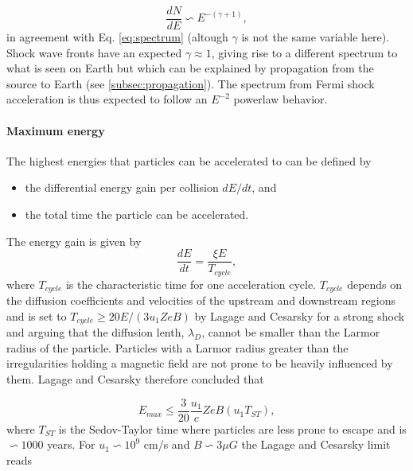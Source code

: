 \begin{equation}
\frac{dN}{dE} \backsim E^{-(\gamma + 1)},
\end{equation}
in agreement with Eq. \ref{eq:spectrum} (altough $\gamma$ is not the same variable here). Shock wave fronts have an expected $\gamma \approx 1$, giving rise to a different spectrum to what is seen on Earth but which can be explained by propagation from the source to Earth (see \ref{subsec:propagation}). The spectrum from Fermi shock acceleration is thus expected to follow an $E^{-2}$ powerlaw behavior.

\paragraph{Maximum energy}
\label{para:maxenergy}
The highest energies that particles can be accelerated to can be defined by

\vspace{2mm}
\begin{itemize}
\item the differential energy gain per collision $dE/dt$, and
\item the total time the particle can be accelerated.
\end{itemize}
\vspace{2mm}
\noindent The energy gain is given by
\begin{equation}
\frac{dE}{dt} = \frac{\xi E}{T_{cycle}},
\end{equation}
where $T_{cycle}$ is the characteristic time for one acceleration cycle. $T_{cycle}$ depends on the diffusion coefficients and velocities of the upstream and downstream regions and is set to $T_{cycle} \geq 20 E/(3 u_1 Z e B)$ by Lagage and Cesarsky \cite{Lagage:1983zz} for a strong shock and arguing that the diffusion lenth, $\lambda_D$, cannot be smaller than the Larmor radius of the particle. Particles with a Larmor radius greater than the irregularities holding a magnetic field are not prone to be heavily influenced by them. Lagage and Cesarsky therefore concluded that

\begin{equation}
E_{max} \leq \frac{3}{20} \frac{u_1}{c} Z e B (u_1 T_{ST}),
\end{equation}
where $T_{ST}$ is the Sedov-Taylor time where particles are less prone to escape and is $\backsim 1000$ years. For $u_1 \backsim 10^9$ cm/s \cite{stanev2010high}  and $B \backsim 3\mu G$ the Lagage and Cesarsky limit reads

